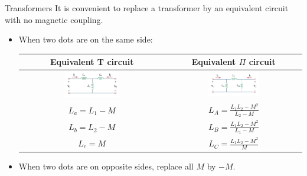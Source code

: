 \documentclass{beamer}
\begin{document}

\begin{frame}{Transformers}
It is convenient to replace a transformer by an equivalent circuit with no magnetic coupling.

\begin{itemize}
    \item When two dots are on the same side:
    \begin{table}[]
    \centering
    \begin{tabular}{cc}
        \toprule
         Equivalent T circuit & Equivalent $\Pi$ circuit  \\
         \midrule
         \includegraphics[width=0.4\textwidth]{C13/16.png}
         &
         \includegraphics[width=0.4\textwidth]{C13/17.png}
         \\
         $L_a = L_1-M$ 
         &
         $L_A = \frac{L_1L_2 - M^2}{L_2-M}$
         \\
          $L_b = L_2 - M$
          &
          $L_B = \frac{L_1L_2 - M^2}{L_1-M}$
          \\
            $L_c = M$
          &
            $L_C = \frac{L_1L_2 - M^2}{M}$
          \\
         \bottomrule
    \end{tabular}

    \end{table}
    
    \item When two dots are on opposite sides, \color{red} replace all $M$ by $-M$\color{black}.
\end{itemize}

\end{frame}
\end{document}
